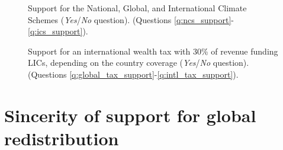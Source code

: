 \documentclass[12pt,english]{article}
\begin{document}
\begin{bibunit}
\begin{figure}[h!]
    \caption[Support for the NCS, GCS, ICS]{Support for the National, Global, and International Climate Schemes (\textit{Yes}/\textit{No} question). \hfill (Questions \ref{q:ncs_support}-\ref{q:ics_support}).
    }\label{fig:ics}
\end{figure}
\begin{figure}[h!]
    \caption[Support for an international wealth tax depending on country coverage]{Support for an international wealth tax with 30\% of revenue funding LICs, depending on the country coverage (\textit{Yes}/\textit{No} question). \hfill (Questions \ref{q:global_tax_support}-\ref{q:intl_tax_support}).
    }\label{fig:wealth_tax}
\end{figure}

\section{Sincerity of support for global redistribution\label{sec:sincerity}}


\end{bibunit}
\end{document}
